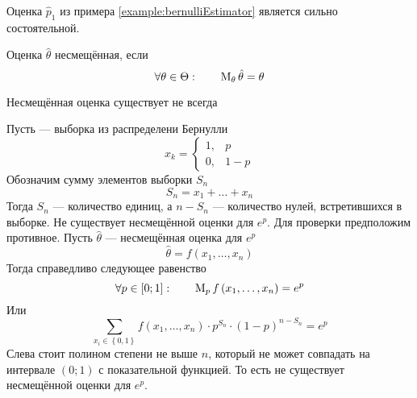\begin{example}
  Оценка $\hat{p}_1$ из примера \ref{example:bernulliEstimator}
  является сильно состоятельной.
\end{example}

\begin{definition}
  \label{def:estimatorBias}
  Оценка $\hat{\theta}$ несмещённая, если
  \begin{equation*}
    \forall\theta\in\Theta: \qquad \operatorname{M}_{\theta} \hat{\theta} = \theta
  \end{equation*}
\end{definition}

\begin{remark}
  Несмещённая оценка существует не всегда
\end{remark}

\begin{example}
  Пусть \xsample --- выборка из распределени Бернулли
  \begin{equation*}
    x_k =
    \begin{cases}
      1,& p \\
      0,& 1-p
    \end{cases}
  \end{equation*}
  Обозначим сумму элементов выборки $S_n$
  \begin{equation*}
    S_n = x_1 + \dots + x_n
  \end{equation*}
  Тогда $S_n$ --- количество единиц, а $n-S_n$ --- количество нулей,
  встретившихся в выборке.
  Не существует несмещённой оценки для $e^p$.
  Для проверки предположим противное.
  Пусть $\hat{\theta}$ --- несмещённая оценка для $e^p$
  \begin{equation*}
    \hat{\theta} = f\left( x_1, \dots, x_n \right)
  \end{equation*}
  Тогда справедливо следующее равенство
  \begin{equation*}
    \forall p \in \left[ 0; 1 \right]:\qquad
    \operatorname{M}_{p} f\left( x_1, \dots, x_n \right)
    = e^p
  \end{equation*}
  Или
  \begin{equation*}
    \sum_{x_i \in \left\{ 0, 1 \right\}} f\left( x_1, \dots, x_n \right)
      \cdot p^{S_n} \cdot \left( 1 - p \right)^{n - S_n}
    = e^p
  \end{equation*}
  Слева стоит полином степени не выше $n$, который не может совпадать на
  интервале $\left( 0; 1 \right)$ с показательной функцией.
  То есть не существует несмещённой оценки для $e^p$.
\end{example}


